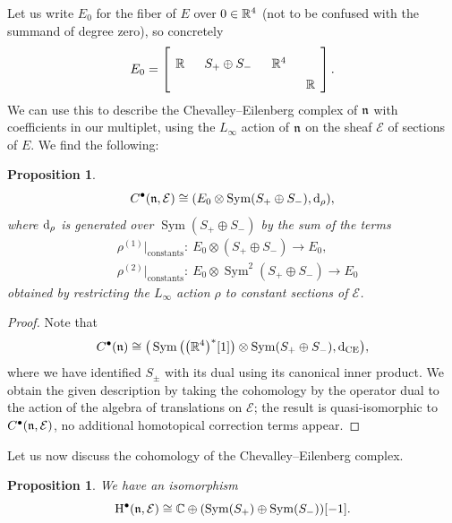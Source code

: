 \documentclass[pdftex]{sigma}
\numberwithin{equation}{section}
\newtheorem{prop}[thm]{Proposition}
{ \theoremstyle{definition}
	\newtheorem{dfn}[thm]{Definition}
	\newtheorem{Note}[thm]{Note}
	\newtheorem{eg}[thm]{Example}
	\newtheorem{rmk}[thm]{Remark} }
\def\cE{\mathcal E}\def\cF{\mathcal F}\def\cG{\mathcal G}\def\cH{\mathcal H}
\def\d{{\rm d}}
\DeclareMathOperator{\Sym}{Sym}
\begin{document}
Let us write $E_0$ for the fiber of $E$ over $0 \in \mathbb R^4$ (not to be confused with the summand of degree zero), so concretely
\begin{equation*} %
E_0 = \left[
\begin{tikzcd}[row sep=0cm, column sep=0.25cm]
\RR & S_+ \oplus S_- & \RR^4 \\
& & &\RR
\end{tikzcd} \right] .
\end{equation*}
We can use this to describe the Chevalley--Eilenberg complex of $\mathfrak n$ with coefficients in our multiplet, using the $L_\infty$ action of $\mathfrak n$ on the sheaf $\mathcal E$ of sections of $E$. We find the following:

\begin{prop}
	\begin{equation*}
	C^\bullet(\fn, \mathcal E) \cong (E_0 \otimes \Sym(S_+ \oplus S_-), \d_\rho),
	\end{equation*}
	where $\d_\rho$ is generated over $\Sym(S_+ \oplus S_-)$ by the sum of the terms
	\begin{align*}
	&\rho^{(1)}|_{\mathrm{constants}} \colon \ E_0 \otimes (S_+ \oplus S_-) \to E_0, \\
	&\rho^{(2)}|_{\mathrm{constants}} \colon \ E_0 \otimes \Sym^2(S_+ \oplus S_-) \to E_0
	\end{align*}
	obtained by restricting the $L_\infty$ action $\rho$ to constant sections of $\mathcal E$.
\end{prop}

\begin{proof}
	Note that
	\begin{equation*}
	C^\bullet(\fn) \cong \big(\Sym\big(\big(\RR^4\big)^*[1]\big) \otimes \Sym(S_+ \oplus S_-), \d_{\mathrm{CE}}\big),
	\end{equation*}
	where we have identified $S_\pm$ with its dual using its canonical inner product. We obtain the given description by taking the cohomology by the operator dual to the action of the algebra of translations on $\mathcal E$; the result is quasi-isomorphic to $C^\bullet(\mathfrak n, \mathcal E)$, no additional homotopical correction terms appear.
\end{proof}

Let us now discuss the cohomology of the Chevalley--Eilenberg complex.

\begin{prop}
	We have an isomorphism
	\begin{equation*}
	\mathrm H^{\bullet}(\fn, \cE) \cong \CC \oplus (\Sym(S_+) \oplus \Sym(S_-))[-1].
	\end{equation*}
\end{prop}
\end{document}
